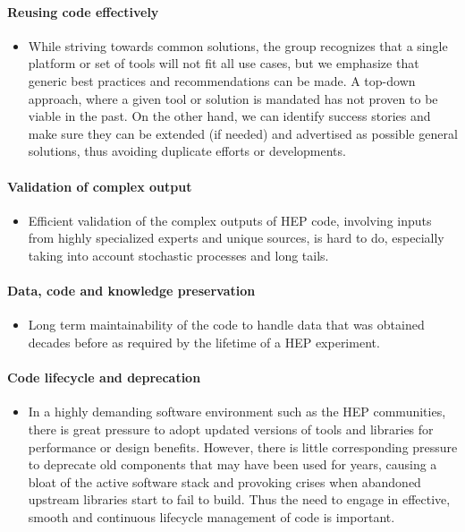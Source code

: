 \documentclass[12pt,a4paper]{article}
\begin{document}
\paragraph{Reusing code effectively}

\begin{itemize}
\item
    While striving towards common solutions, the group recognizes that a
  single platform or set of tools will not fit all use cases, but we
  emphasize that generic best practices and recommendations can be made.
  A top-down approach, where a given tool or solution is mandated has
  not proven to be viable in the past. On the other hand, we can
  identify success stories and make sure they can be extended (if
  needed) and advertised as possible general solutions, thus avoiding
  duplicate efforts or developments.
  \end{itemize}

\paragraph{Validation of complex output}

\begin{itemize}
\item
    Efficient validation of the complex outputs of HEP code, involving
  inputs from highly specialized experts and unique sources, is hard to
  do, especially taking into account stochastic processes and long
  tails.
  \end{itemize}

\paragraph{Data, code and knowledge preservation}

\begin{itemize}
\item
    Long term maintainability of the code to handle data that was obtained
  decades before as required by the lifetime of a HEP experiment.
  \end{itemize}

\paragraph{Code lifecycle and deprecation}

\begin{itemize}
\item
    In a highly demanding software environment such as the HEP
  communities, there is great pressure to adopt updated versions of
  tools and libraries for performance or design benefits. However, there
  is little corresponding pressure to deprecate old components that may
  have been used for years, causing a bloat of the active software stack
  and provoking crises when abandoned upstream libraries start to fail
  to build. Thus the need to engage in effective, smooth and continuous
  lifecycle management of code is important.
  \end{itemize}
\end{document}
